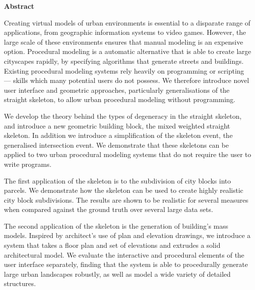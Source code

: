 \vspace*{1.75in}
\begin{center} {\bf Abstract}\end{center}

Creating virtual models of urban environments is essential to a disparate range of applications, from geographic information systems to video games. However, the large scale of these environments ensures that manual modeling is an expensive option. Procedural modeling is a automatic alternative that is able to create large cityscapes rapidly, by specifying algorithms that generate streets and buildings. Existing procedural modeling systems rely heavily on programming or scripting --- skills which many potential users do not possess. We therefore introduce novel user interface and geometric approaches, particularly generalisations of the straight skeleton, to allow urban procedural modeling without programming.

We develop the theory behind the types of degeneracy in the straight skeleton, and introduce a new geometric building block, the mixed weighted straight skeleton. In addition we introduce a simplification of the skeleton event, the generalised intersection event. We demonstrate that these skeletons can be applied to two urban procedural modeling systems that do not require the user to write programs.

The first application of the skeleton is to the subdivision of city blocks into parcels. We demonstrate how the skeleton can be used to create highly realistic city block subdivisions. The results are shown to be realistic for several measures when compared against the ground truth over several large data sets. 

The second application of the skeleton is the generation of building's mass models. Inspired by architect's use of plan and elevation drawings, we introduce a system that takes a floor plan and set of elevations and extrudes a solid architectural model. We evaluate the interactive and procedural elements of the user interface separately, finding that the system is able to procedurally generate large urban landscapes robustly, as well as model a wide variety of detailed structures. 
